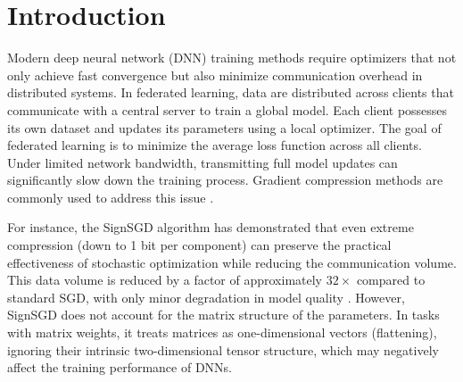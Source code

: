 \documentclass[letterpaper]{article} %
\begin{document}
\section{Introduction}\label{sec:intro}
Modern deep neural network (DNN) training methods require optimizers that not only achieve fast convergence but also minimize communication overhead in distributed systems. In federated learning, data are distributed across clients that communicate with a central server to train a global model. Each client possesses its own dataset and updates its parameters using a local optimizer. The goal of federated learning is to minimize the average loss function across all clients. Under limited network bandwidth, transmitting full model updates can significantly slow down the training process. Gradient compression methods are commonly used to address this issue \cite{bernstein2018signsgd,  bernstein2019signsgdmajority, beznosikov2020biased}.

For instance, the SignSGD algorithm has demonstrated that even extreme compression (down to 1 bit per component) can preserve the practical effectiveness of stochastic optimization while reducing the communication volume. This data volume is reduced by a factor of approximately $32\times$ compared to standard SGD, with only minor degradation in model quality \cite{bernstein2018signsgd, bernstein2019signsgdmajority}. However, SignSGD does not account for the matrix structure of the parameters. In tasks with matrix weights, it treats matrices as one-dimensional vectors (flattening), ignoring their intrinsic two-dimensional tensor structure, which may negatively affect the training performance of DNNs.
\end{document}
